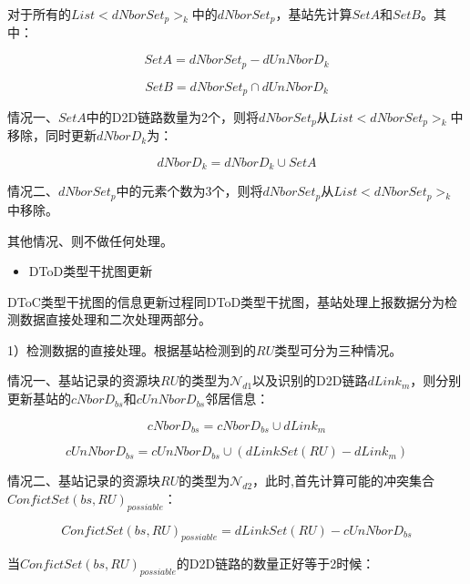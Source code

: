 \documentclass[figurelist,tablelist,algorithmlist,nomlist,masters]{seuthesix}
\begin{document}
	对于所有的$List < dNborSet_{p}{ > _k}$中的$dNborSet_{p}$，基站先计算$SetA$和$SetB$。其中：

	\begin{equation}\label{eq2.18}
	SetA = dNborSet_{p} - dUnNborD_k
	\end{equation}

	\begin{equation}\label{eq2.19}
	SetB = dNborSet_{p} \cap dUnNborD_k
	\end{equation}

	情况一、$SetA$中的D2D链路数量为2个，则将$dNborSet_{p}$从$List < dNborSet_{p}{ > _k}$中移除，同时更新$dNborD_k$为：

	\begin{equation}\label{eq2.20}
	dNborD_k = dNborD_k \cup SetA
	\end{equation}

	情况二、$dNborSet_{p}$中的元素个数为3个，则将$dNborSet_{p}$从$List < dNborSet_{p}{ > _k}$中移除。

	其他情况、则不做任何处理。


	\begin{itemize}
		\item DToD类型干扰图更新
	\end{itemize}

	DToC类型干扰图的信息更新过程同DToD类型干扰图，基站处理上报数据分为检测数据直接处理和二次处理两部分。

	1）检测数据的直接处理。根据基站检测到的$RU$类型可分为三种情况。

	情况一、基站记录的资源块$RU$的类型为$\mathcal{N}_{d1}$以及识别的D2D链路$dLink_m$，则分别更新基站的$cNborD_{bs}$和$cUnNborD_{bs}$邻居信息：

	\begin{equation}\label{eq2.21}
	cNborD_{bs} = cNborD_{bs} \cup dLink_m
	\end{equation}

	\begin{equation}\label{eq2.22}
	cUnNborD_{bs} = cUnNborD_{bs} \cup (dLinkSet(RU) - dLink_m)
	\end{equation}

	情况二、基站记录的资源块$RU$的类型为$\mathcal{N}_{d2}$，此时,首先计算可能的冲突集合$ConfictSet{(bs,RU)_{possiable}}$：

	\begin{equation}\label{eq2.23}
	ConfictSet{(bs,RU)_{possiable}} = dLinkSet(RU) - cUnNborD_{bs}
	\end{equation}


	当$ConfictSet{(bs,RU)_{possiable}}$的D2D链路的数量正好等于2时候：
\end{document}
